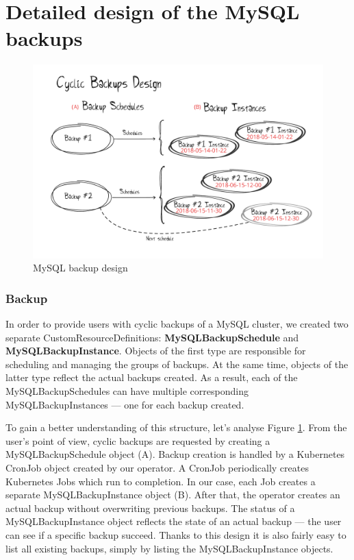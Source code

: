 \section{Detailed design of the MySQL backups}

\begin{figure}[!ht]
    \centering
    \includegraphics[width=1\textwidth, angle=0]{img/cyclic_backups.pdf}
    \caption{MySQL backup design}
    \label{fig:backups}
\end{figure}

\subsubsection*{Backup}
In order to provide users with cyclic backups of a MySQL cluster, we created 
two separate CustomResourceDefinitions: \textbf{MySQLBackupSchedule} and 
\textbf{MySQLBackupInstance}. Objects of the first type are responsible for 
scheduling and managing the groups of backups. At the same time, objects 
of the latter type reflect the actual backups created. As a result, each 
of the MySQLBackupSchedules can have multiple corresponding 
MySQLBackupInstances --- one for each backup created.

To gain a better understanding of this structure, let’s analyse Figure 
\ref{fig:backups}. From the user's point of view, cyclic backups are requested 
by creating a MySQLBackupSchedule object (A). Backup creation is handled 
by a Kubernetes CronJob object created by our operator. A CronJob periodically 
creates Kubernetes Jobs which run to completion. In our case, each
Job creates a separate MySQLBackupInstance object (B). After that, the 
operator creates an actual backup without overwriting previous 
backups. The status of a MySQLBackupInstance object reflects the state of 
an actual backup --- the user can see if a specific backup succeed. Thanks 
to this design it is also fairly easy to list all existing backups, 
simply by listing the MySQLBackupInstance objects.

